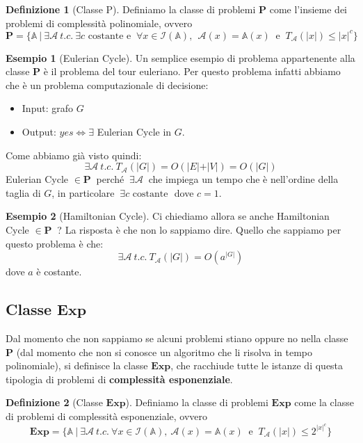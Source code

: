 \documentclass[a4paper]{article}
\theoremstyle{definition}
\newtheorem{esempio}{Esempio}[subsection]
\newtheorem{definit}{Definizione}[subsection]
\newcommand{\Exp}{\mathbf{Exp}}
\newcommand{\p}{\mathbf{P}}
\newcommand{\prob}[1]{\mathbb{#1}}
\newcommand{\instance}[1]{\mathcal{I}(\prob{#1})}
\newcommand{\alg}[1]{\mathcal{#1}}
\newcommand{\compl}[2]{T_\alg{#1}( \vert #2 \vert)}
\begin{document}
			\begin{definit}[Classe P]
				Definiamo la classe di problemi $\p$ come l'insieme dei problemi di complessità polinomiale, ovvero 
				\[ 
					\p = \big\lbrace \prob{A}\ \vert\ \exists \alg{A}\ t.c.\ \exists c \text{ costante e }\ \forall x \in \instance{A},\ \ \alg{A}(x) = \prob{A}(x)\ \text{ e }\ \compl{A}{x} \leq \vert x \vert ^ c \big\rbrace 
				\]
			\end{definit}
			
			\begin{esempio}[Eulerian Cycle]
				Un semplice esempio di problema appartenente alla classe $\p$ è il problema del tour euleriano. Per questo problema infatti abbiamo che è un problema computazionale di decisione:
				\begin{itemize}
					\item Input: grafo $ G $
					\item Output: $ yes \Leftrightarrow \exists $ Eulerian Cycle in $ G $.
				\end{itemize}
				Come abbiamo già visto quindi:
				\[
					\exists \alg{A}\ t.c.\ \compl{A}{G} = O(\vert E\vert + \vert V\vert) = O(\vert G\vert) 
				\] 
				Eulerian Cycle $ \in \p\ $ perché $\ \exists \alg{A}\ $ che impiega un tempo che è nell'ordine della taglia di $ G $, in particolare $ \ \exists c \text{ costante } $ dove $ c=1 $.
			\end{esempio}
			
			
			\begin{esempio}[Hamiltonian Cycle]
				Ci chiediamo allora se anche Hamiltonian Cycle $ \in \p\ $ ? La risposta è che non lo sappiamo dire. Quello che sappiamo per questo problema è che:
				\[
					\exists \alg{A}\ t.c.\ \compl{A}{G} = O(a^{\vert G \vert})
				\]
				dove $ a $ è costante.
			\end{esempio}
			
			\subsection{Classe $ \Exp $}
			Dal momento che non sappiamo se alcuni problemi stiano oppure no nella classe $\p$ (dal momento che non si conosce un algoritmo che li risolva in tempo polinomiale), si definisce la classe $\Exp$, che racchiude tutte le istanze di questa tipologia di problemi di \textbf{complessità esponenziale}.
			
			\begin{definit}[Classe $ \Exp $]
				Definiamo la classe di problemi $\Exp$ come la classe di problemi di complessità esponenziale, ovvero 
				\[ 
					\Exp = \big\lbrace \prob{A}\ \vert\ \exists \alg{A}\ t.c.\ \forall x \in \instance{A},\ \alg{A}(x) = \prob{A}(x)\ \text{ e }\ \compl{A}{x} \leq 2^{\vert x \vert ^ c} \big\rbrace 
				\]
			\end{definit}
			
\end{document}
